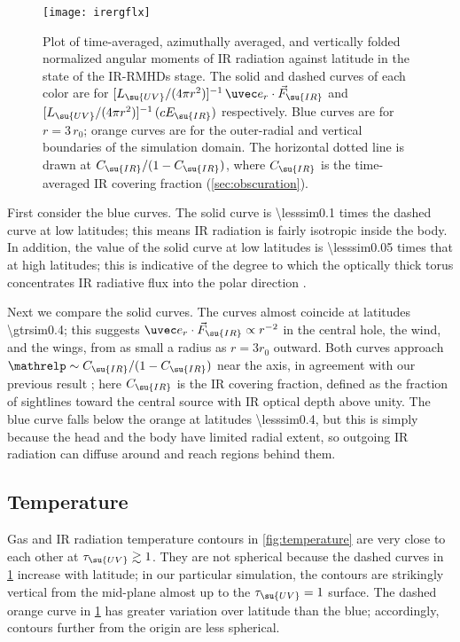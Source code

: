 \documentclass[twocolumn]{article}
\newcommand*\irrmhd{\ac{IR}\protect\nobreakdash-\acp{RMHD}}
\begin{document}
\begin{figure}
\texttt{[image: irergflx]}
\caption{Plot of time-averaged, azimuthally averaged, and vertically folded
normalized angular moments of \ac{IR} radiation against latitude in the
 state of the \irrmhd{} stage. The solid and dashed curves of
each color are for $[L_\su{UV}/(4\pi r^2)]^{-1}\,\uvec e_r\cdot\vec F_\su{IR}$
and $[L_\su{UV}/(4\pi r^2)]^{-1}\,(cE_\su{IR})$ respectively. Blue curves are
for $r=3\,r_0$; orange curves are for the outer-radial and vertical boundaries
of the simulation domain. The horizontal dotted line is drawn at
$C_\su{IR}/(1-C_\su{IR})$, where $C_\su{IR}$ is the time-averaged \ac{IR}
covering fraction (\cref{sec:obscuration}).}
\label{fig:IR angular moments}
\end{figure}

First consider the blue curves. The solid curve is \num{\lesssim0.1} times the
dashed curve at low latitudes; this means \ac{IR} radiation is fairly isotropic
inside the body. In addition, the value of the solid curve at low latitudes is
\num{\lesssim0.05} times that at high latitudes; this is indicative of the
degree to which the optically thick torus concentrates \ac{IR} radiative flux
into the polar direction .

Next we compare the solid curves. The curves almost coincide at latitudes
\num{\gtrsim0.4}; this suggests $\uvec e_r\cdot\vec F_\su{IR}\propto r^{-2}$ in
the central hole, the wind, and the wings, from as small a radius as $r=3r_0$
outward. Both curves approach $\mathrelp\sim C_\su{IR}/(1-C_\su{IR})$ near the
axis, in agreement with our previous result ;
here $C_\su{IR}$ is the \ac{IR} covering fraction, defined as the fraction of
sightlines toward the central source with \ac{IR} optical depth above unity.
The blue curve falls below the orange at latitudes \num{\lesssim0.4}, but this
is simply because the head and the body have limited radial extent, so outgoing
\ac{IR} radiation can diffuse around and reach regions behind them.

\subsection{Temperature}
\label{sec:temperature}

Gas and \ac{IR} radiation temperature contours in \cref{fig:temperature} are
very close to each other at $\tau_\su{UV}\gtrsim1$. They are not spherical
because the dashed curves in \cref{fig:IR angular moments} increase with
latitude; in our particular simulation, the contours are strikingly vertical
from the mid-plane almost up to the $\tau_\su{UV}=1$ surface. The dashed orange
curve in \cref{fig:IR angular moments} has greater variation over latitude than
the blue; accordingly, contours further from the origin are less spherical.
\end{document}
